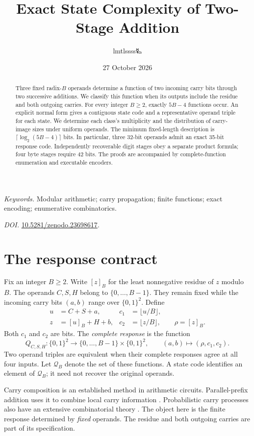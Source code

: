 \documentclass[11pt,a4paper]{article}
\title{\LARGE Exact State Complexity of Two-Stage Addition}
\author{lmtlssss{\authorsymbol 🜐}}
\date{27 October 2026}
\theoremstyle{definition}\newtheorem{definition}[theorem]{Definition}
\newcommand{\res}[1]{[#1]_B}
\newcommand{\pairs}{\{0,1\}^2}
\newcommand{\Q}{\mathcal Q_B}
\begin{document}
\maketitle\thispagestyle{plain}
\begin{abstract}
Three fixed radix-$B$ operands determine a function of two incoming carry
bits through two successive additions. We classify this function when its
outputs include the residue and both outgoing carries. For every integer
$B\geq2$, exactly $5B-4$ functions occur. An explicit normal form gives a
contiguous state code and a representative operand triple for each state.
We determine each class's multiplicity and the distribution of carry-image
sizes under uniform operands. The minimum fixed-length description is
$\lceil\log_2(5B-4)\rceil$ bits. In particular, three 32-bit operands admit
an exact 35-bit response code. Independently recoverable digit stages obey
a separate product formula; four byte stages require 42 bits. The proofs
are accompanied by complete-function enumeration and executable encoders.
\end{abstract}
\noindent\textit{Keywords.} Modular arithmetic; carry propagation; finite functions;
exact encoding; enumerative combinatorics.\par
\noindent\textit{DOI.} \href{https://doi.org/10.5281/zenodo.23698617}{10.5281/zenodo.23698617}.

\section{The response contract}
Fix an integer $B\geq2$. Write $\res z$ for the least nonnegative residue
of $z$ modulo $B$. The operands $C,S,H$ belong to $\{0,\ldots,B-1\}$.
They remain fixed while the incoming carry bits $(a,b)$ range over $\pairs$.
Define
\begin{align}
 u&=C+S+a,& c_1&=\lfloor u/B\rfloor,\label{eq:first}\\
 z&=\res u+H+b,& c_2&=\lfloor z/B\rfloor,\qquad \rho=\res z.\label{eq:second}
\end{align}
Both $c_1$ and $c_2$ are bits. The \emph{complete response} is the function
\[
 Q_{C,S,H}:\pairs\longrightarrow\{0,\ldots,B-1\}\times\pairs,
 \qquad (a,b)\longmapsto(\rho,c_1,c_2).
\]
Two operand triples are equivalent when their complete responses agree
at all four inputs. Let $\Q$ denote the set of these functions.
A state code identifies an element of $\Q$; it need not recover the
original operands.

Carry composition is an established method in arithmetic circuits.
Parallel-prefix addition uses it to combine local carry information
\cite{brentkung}. Probabilistic carry processes also have an extensive
combinatorial theory \cite{diaconisfulman}. The object here is the finite
response determined by \emph{fixed} operands. The residue and both
outgoing carries are part of its specification.
\end{document}

